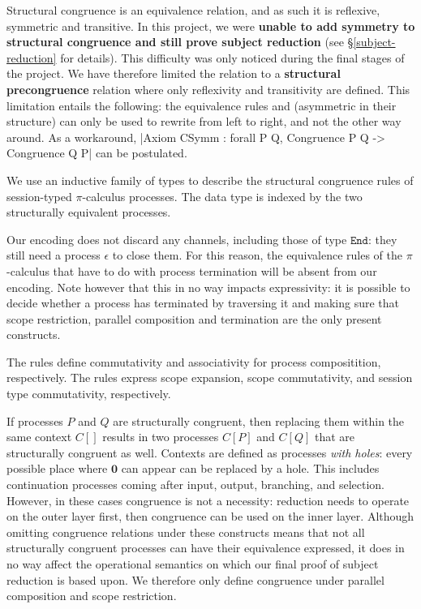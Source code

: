 \documentclass{mproj}
\newcommand{\PO}{\mathbf{0}}
\newcommand{\picalc}{$\pi$-calculus}
\newcommand{\type}{\texttt}
\newcommand{\End}{\type{End}}
\begin{document}
Structural congruence is an equivalence relation, and as such it is reflexive, symmetric and transitive. In this project, we were \textbf{unable to add symmetry to structural congruence and still prove subject reduction} (see \S \ref{subject-reduction} for details). This difficulty was only noticed during the final stages of the project. We have therefore limited the relation to a \textbf{structural precongruence} relation where only reflexivity and transitivity are defined. This limitation entails the following: the equivalence rules  and  (asymmetric in their structure) can only be used to rewrite from left to right, and not the other way around. As a workaround, \coqe|Axiom CSymm : forall {P Q}, Congruence P Q -> Congruence Q P| can be postulated.

We use an inductive family of types to describe the structural congruence rules of session-typed \picalc{} processes. The data type is indexed by the two structurally equivalent processes.


Our encoding does not discard any channels, including those of type $\End$: they still need a process $\epsilon$ to close them. For this reason, the equivalence rules of the \picalc{} that have to do with process termination will be absent from our encoding. Note however that this in no way impacts expressivity: it is possible to decide whether a process has terminated by traversing it and making sure that scope restriction, parallel composition and termination are the only present constructs.

The  rules define commutativity and associativity for process compositition, respectively. The  rules express scope expansion, scope commutativity, and session type commutativity, respectively.


If processes $P$ and $Q$ are structurally congruent, then replacing them within the same context $C[]$ results in two processes $C[P]$ and $C[Q]$ that are structurally congruent as well. Contexts are defined as processes \emph{with holes}: every possible place where $\PO$ can appear can be replaced by a hole. This includes continuation processes coming after input, output, branching, and selection. However, in these cases congruence is not a necessity: reduction needs to operate on the outer layer first, then congruence can be used on the inner layer. Although omitting congruence relations under these constructs means that not all structurally congruent processes can have their equivalence expressed, it does in no way affect the operational semantics on which our final proof of subject reduction is based upon. We therefore only define congruence under parallel composition and scope restriction.
\end{document}
